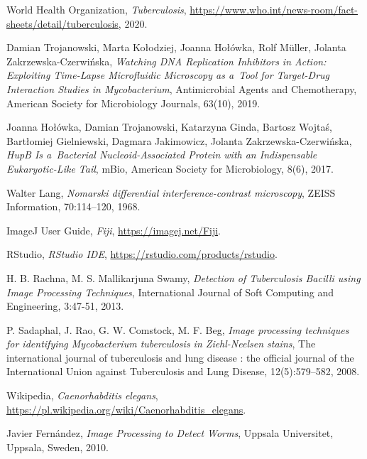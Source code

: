 \documentclass[declaration,shortabstract,mgr]{iithesis}
\begin{document}
\begin{thebibliography}{1}

  World Health Organization,
  \emph{Tuberculosis},
  \url{https://www.who.int/news-room/fact-sheets/detail/tuberculosis},
  2020.

  Damian Trojanowski, Marta Kołodziej, Joanna Hołówka, Rolf M{\"u}ller, Jolanta Zakrzewska-Czerwińska,
  \emph{Watching DNA Replication Inhibitors in Action: Exploiting Time-Lapse Microfluidic Microscopy as a~Tool for Target-Drug Interaction Studies in Mycobacterium},
  Antimicrobial Agents and Chemotherapy,
  American Society for Microbiology Journals,
  63(10),
  2019.

  Joanna Hołówka, Damian Trojanowski, Katarzyna Ginda, Bartosz Wojtaś, Bartłomiej Gielniewski, Dagmara Jakimowicz, Jolanta Zakrzewska-Czerwińska,
  \emph{HupB Is a~Bacterial Nucleoid-Associated Protein with an Indispensable Eukaryotic-Like Tail},
  mBio,
  American Society for Microbiology,
  8(6),
  2017.

  Walter Lang,
  \emph{Nomarski differential interference-contrast microscopy},
  ZEISS Information,
  70:114–120,
  1968.

  ImageJ User Guide,
  \emph{Fiji},
  \url{https://imagej.net/Fiji}.

  RStudio,
  \emph{RStudio IDE},
  \url{https://rstudio.com/products/rstudio}.

  H. B. Rachna, M. S. Mallikarjuna Swamy,
  \emph{Detection of Tuberculosis Bacilli using Image Processing Techniques},
  International Journal of Soft Computing and Engineering,
  3:47-51,
  2013.

  P. Sadaphal, J. Rao, G. W. Comstock, M. F. Beg,
  \emph{Image processing techniques for identifying Mycobacterium tuberculosis in Ziehl-Neelsen stains},
  The international journal of tuberculosis and lung disease : the official journal of the International Union against Tuberculosis and Lung Disease,
  12(5):579–582,
  2008.

  Wikipedia,
  \emph{Caenorhabditis elegans},
  \url{https://pl.wikipedia.org/wiki/Caenorhabditis_elegans}.

  Javier Fernández,
  \emph{Image Processing to Detect Worms},
  Uppsala Universitet,
  Uppsala,
  Sweden,
  2010.


\end{thebibliography}
\end{document}
